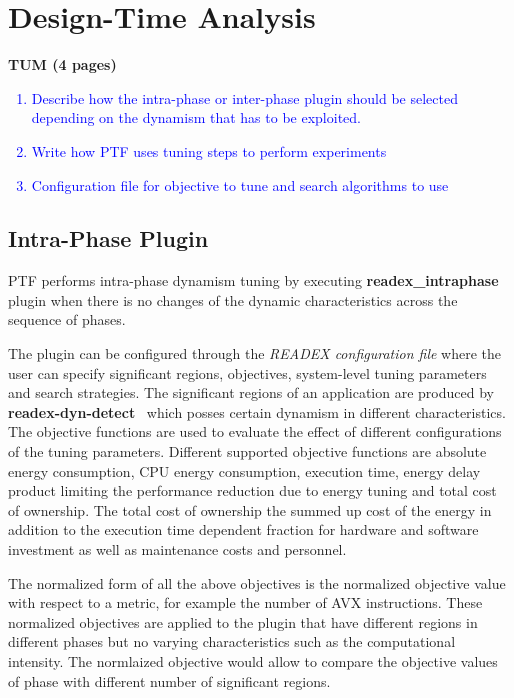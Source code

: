 \section{Design-Time Analysis} \label{sec:dta}
\textbf{TUM (4 pages)} 

\textcolor{blue}{\begin{enumerate}
  \item Describe how the intra-phase or inter-phase plugin should be selected depending on the dynamism that has to be exploited. 
  \item Write how PTF uses tuning steps to perform experiments
  \item Configuration file for objective to tune and search algorithms to use
\end{enumerate}
}

\subsection{Intra-Phase Plugin} \label{sec:intra-phase}

PTF performs intra-phase dynamism tuning by executing \textbf{readex\_intraphase} plugin when there is no changes of the dynamic characteristics across the sequence of phases.

The plugin can be configured through the \textit{READEX configuration file} where the user can specify significant regions, objectives, system-level tuning parameters and search strategies. The significant regions of an application are produced by \textbf{readex-dyn-detect}~\cite{kumaraswamy2018design} which posses certain dynamism in different characteristics. The objective functions are used to evaluate the effect of different configurations of the tuning parameters. Different supported objective functions are absolute energy consumption, CPU energy consumption, execution time, energy delay product limiting the performance reduction due to energy tuning and total cost of ownership.  The total cost of ownership the summed up cost of the energy in addition to the execution time dependent fraction for hardware and software investment as well as maintenance costs and personnel. 

The normalized form of all the above objectives is the normalized objective value with respect to a metric, for example the number of AVX instructions. These normalized objectives are applied to the plugin that have different regions in different phases but no varying characteristics such as the computational intensity. The normlaized objective would allow to compare the objective values of phase with different number of significant regions. 

